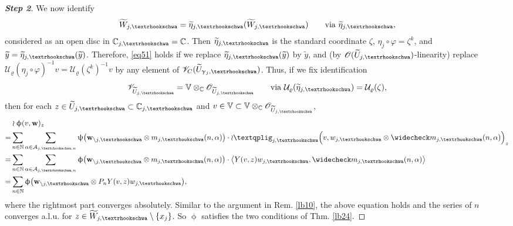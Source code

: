 \documentclass[11pt,b5paper,notitlepage]{article}
\theoremstyle{definition}
\theoremstyle{plain}
\newcommand{\mc}{\mathcal}
\newcommand{\wtd}{\widetilde}
\newcommand{\wch}{\widecheck}
\newcommand{\scr}{\mathscr}
\newcommand{\Vbb}{\mathbb V}
\newcommand{\Cbb}{\mathbb C}
\newcommand{\Nbb}{\mathbb N}
\newcommand{\wbf}{\mathbf w}
\newcommand{\tipae}{\text{\textrhookschwa}}
\newcommand{\tipxphi}{\text{\textqplig}}
\numberwithin{equation}{subsection}
\begin{document}
\begin{proof}[\textbf{Step 2}]
We now identify
\begin{align*}
\wtd W_{j,\tipae}=\wtd\eta_{j,\tipae}	(\wtd W_{j,\tipae})\qquad\text{via }\wtd\eta_{j,\tipae},
\end{align*}
considered as an open disc in $\Cbb_{j,\tipae}=\Cbb$. Then $\wtd\eta_{j,\tipae}$ is the standard coordinate $\zeta$, $\eta_j\circ\varphi=\zeta^k$, and $\wtd y=\wtd\eta_{j,\tipae}(\wtd y)$. Therefore, \eqref{eq51} holds if we replace $\wtd \eta_{j,\tipae}(\wtd y)$ by $\wtd y$, and (by $\scr O(\wtd U_{j,\tipae})$-linearity) replace $\mc U_\varrho(\eta_j\circ\varphi)^{-1}v=\mc U_\varrho(\zeta^k)^{-1}v$ by any element of $\scr V_C(\wtd U_{\upgamma_j,\tipae})$. Thus, if we fix identification
\begin{align*}
\scr V_{\wtd U_{j,\tipae}}=\Vbb\otimes_\Cbb\scr O_{\wtd U_{j,\tipae}}\qquad\text{via }\mc U_\varrho(\wtd\eta_{j,\tipae})=\mc U_\varrho(\zeta),	
\end{align*}
then for each $z\in\wtd U_{j,\tipae}\subset\Cbb_{j,\tipae}$  and $v\in\Vbb\subset\Vbb\otimes_\Cbb\scr O_{\wtd U_{j,\tipae}}$,
\begin{align*}
&\wr\upphi(v,\wbf)_z\nonumber\\
=&\sum_{n\in\Nbb}\sum_{\alpha\in\mc A_{j,\tipae,n}}\uppsi\big(\wbf_{\setminus j,\tipae}\otimes m_{j,\tipae}(n,\alpha) \big)\cdot \wr\tipxphi_{j,\tipae}\Big(v,w_{j,\tipae}\otimes\wch m_{j,\tipae}(n,\alpha)\Big)_z\\
=&\sum_{n\in\Nbb}\sum_{\alpha\in\mc A_{j,\tipae,n}}\upphi\big(\wbf_{\setminus j,\tipae}\otimes m_{j,\tipae}(n,\alpha) \big)\cdot\big\langle Y(v,z)w_{j,\tipae},\wch m_{j,\tipae}(n,\alpha)\big\rangle\\
=&\sum_{n\in\Nbb}\upphi\big(\wbf_{\setminus j,\tipae}\otimes P_nY(v,z)w_{j,\tipae} \big),
\end{align*}
where the rightmost part converges absolutely. Similar to the argument in Rem. \ref{lb10}, the above equation holds and the series of $n$ converges a.l.u. for $z\in\wtd W_{j,\tipae}\setminus\{x_j\}$. So $\upphi$ satisfies the two conditions of Thm. \ref{lb24}. 
\end{proof}
\end{document}
